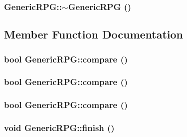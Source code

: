 \hypertarget{classGenericRPG_cff866cbb752b594437b5ddca59e0f03}{
\subsubsection[{$\sim$GenericRPG}]{\setlength{\rightskip}{0pt plus 5cm}GenericRPG::$\sim$GenericRPG ()}}
\label{classGenericRPG_cff866cbb752b594437b5ddca59e0f03}




\subsection{Member Function Documentation}
\hypertarget{classGenericRPG_4b7a50fa77416fc8b4f16948fb4da592}{
\subsubsection[{compare}]{\setlength{\rightskip}{0pt plus 5cm}bool GenericRPG::compare ()}}
\label{classGenericRPG_4b7a50fa77416fc8b4f16948fb4da592}


\hypertarget{classGenericRPG_4b7a50fa77416fc8b4f16948fb4da592}{
\subsubsection[{compare}]{\setlength{\rightskip}{0pt plus 5cm}bool GenericRPG::compare ()}}
\label{classGenericRPG_4b7a50fa77416fc8b4f16948fb4da592}


\hypertarget{classGenericRPG_4b7a50fa77416fc8b4f16948fb4da592}{
\subsubsection[{compare}]{\setlength{\rightskip}{0pt plus 5cm}bool GenericRPG::compare ()}}
\label{classGenericRPG_4b7a50fa77416fc8b4f16948fb4da592}


\hypertarget{classGenericRPG_03ec120747d2935217291fe23f4c36dd}{
\subsubsection[{finish}]{\setlength{\rightskip}{0pt plus 5cm}void GenericRPG::finish ()}}
\label{classGenericRPG_03ec120747d2935217291fe23f4c36dd}


